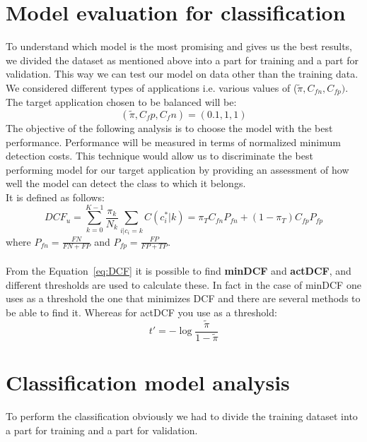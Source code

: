 \documentclass{article}
\begin{document}
\section{Model evaluation for classification}
To understand which model is the most promising and gives us the best results, we divided the dataset as mentioned above into a part for training and a part for validation. This way we can test our model on data other than the training data.\\
We considered different types of applications i.e. various values of (\( \tilde{\pi},C_{fn},C_{fp})\). The target application chosen to be balanced will be:
\begin{equation}
    (\tilde{\pi},C_fp,C_fn) = (0.1,1,1)
\end{equation}
The objective of the following analysis is to choose the model with the best performance. Performance will be measured in terms of normalized minimum detection costs. This technique would allow us to discriminate the best performing model for our target application by providing an assessment of how well the model can detect the class to which it belongs. 
\\
It is defined as follows:
\begin{equation}
    DCF_u= \sum_{k=0}^{K-1} \frac{\pi_k}{N_k} \sum_{i|c_i=k}C(c_i^*|k)=\pi_TC_{fn} P_{fn}+(1-\pi_T)C_{fp}P_{fp} 
\end{equation}
\label{eq:DCF}
where \(P_{fn}=\frac{FN}{FN+FP}\) and \(P_{fp}=\frac{FP}{FP+TP}\).\\
\\
From the Equation~\ref{eq:DCF}  it is possible to find \textbf{minDCF} and \textbf{actDCF}, and different thresholds are used to calculate these. In fact in the case of minDCF one uses as a threshold the one that minimizes DCF and there are several methods to be able to find it. Whereas for actDCF you use as a threshold:
\begin{equation}
    t'=-\log{\frac{\tilde{\pi}}{1-\tilde{\pi}}}
\end{equation}

\section{Classification model analysis}
To perform the classification obviously we had to divide the training dataset into a part for training and a part for validation.
\end{document}
